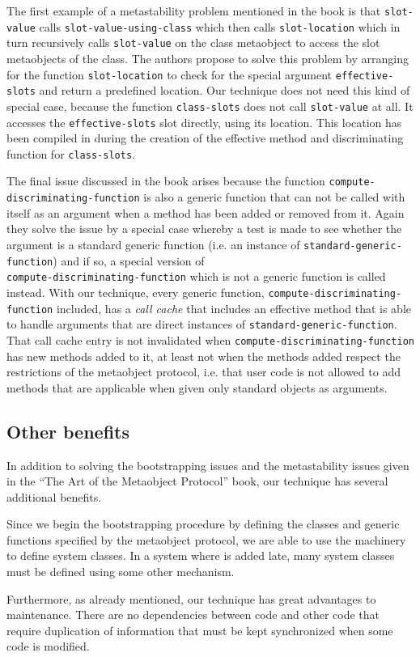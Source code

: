 The first example of a metastability problem mentioned in the book is
that \texttt{slot-value} calls \texttt{slot-value-using-class} which
then calls \texttt{slot-location} which in turn recursively calls
\texttt{slot-value} on the class metaobject to access the slot
metaobjects of the class.  The authors propose to solve this problem
by arranging for the function \texttt{slot-location} to check for the
special argument
\texttt{effective-slots} and return a predefined
location.  Our technique does not need this kind of special case,
because the function \texttt{class-slots} does not call
\texttt{slot-value} at all.  It accesses the \texttt{effective-slots}
slot directly, using its location.  This location has been compiled in
during the creation of the effective method and discriminating
function for \texttt{class-slots}.

The final issue discussed in the book arises because the function
\texttt{compute-discriminating-function} is also a generic function
that can not be called with itself as an argument when a method has
been added or removed from it.  Again they solve the issue by a
special case whereby a test is made to see whether the argument is a
standard generic function (i.e. an instance of
\texttt{standard-generic-function}) and if so, a special version of\\
\texttt{compute-discriminating-function} which is not a generic
function is called instead.  With our technique, every generic
function, \texttt{compute-discriminating-function} included, has a 
\emph{call cache} that includes an effective method that is able to
handle arguments that are direct instances of
\texttt{standard-generic-function}.  That call cache entry is not
invalidated when
\texttt{compute-discriminating-function} has new
methods added to it, at least not when the
methods added respect the restrictions of the metaobject protocol,
i.e. that user code is not allowed to add methods that are applicable
when given only standard objects as arguments.

\subsection{Other benefits}

In addition to solving the bootstrapping issues and the metastability
issues given in the ``The Art of the Metaobject Protocol'' book, our
technique has several additional benefits.

Since we begin the bootstrapping procedure by
defining the classes and generic functions specified by the metaobject
protocol, we are able to use the \clos{} machinery to define system
classes.  In a system where \clos{} is added late, many system classes
must be defined using some other mechanism.

Furthermore, as already mentioned, our technique has great advantages
to maintenance.  There are no dependencies between \clos{} code and
other code that require duplication of information that must be kept
synchronized when some code is modified.
